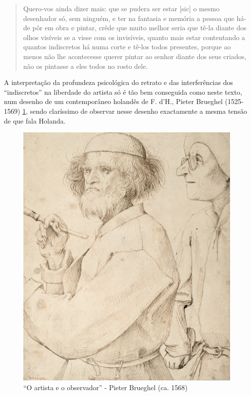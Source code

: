 \documentclass{article}
\begin{document}
\begin{quote}
  Quero-vos ainda dizer mais: que se pudera ser estar [sic] o mesmo
  desenhador só, sem ninguém, e ter na fantasia e memória a pessoa que
  há-de pôr em obra e pintar, crêde que muito melhor seria que tê-la
  diante dos olhos visíveis se a visse com os invisíveis, quanto mais
  estar contentando a quantos indiscretos há numa corte e tê-los todos
  presentes, porque ao menos não lhe acontecesse querer pintar ao
  senhor diante dos seus criados, não os pintasse a eles todos no
  rosto dele.
\end{quote}

A interpretação da profundeza psicológica do retrato e das
interferências dos ``indiscretos'' na liberdade do artista só é tão
bem conseguida como neste texto, num desenho de um contemporâneo
holandês de F. d'H., Pieter Brueghel (1525-1569) \ref{fig:1}, sendo
claríssimo de observar nesse desenho exactamente a mesma tensão de que
fala Holanda.

\begin{figure}
\centering\includegraphics[height=0.3\textheight,keepaspectratio]
                          {images/brueghel.jpg}
  \caption{``O artista e o observador'' - Pieter Brueghel (ca. 1568)}
  \label{fig:1}
\end{figure}
\end{document}
